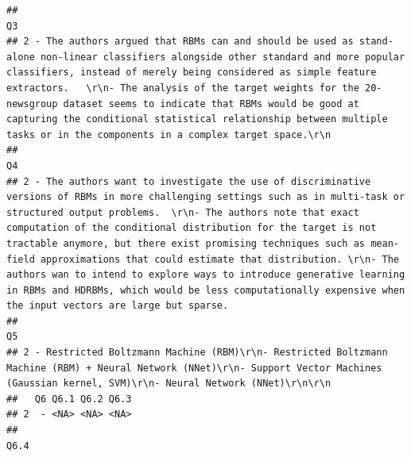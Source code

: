 \documentclass[
]{article}
\begin{document}
\begin{verbatim}
##                                                                                                                                                                                                                                                                                                                                                                                                                                                                       Q3
## 2 - The authors argued that RBMs can and should be used as stand-alone non-linear classifiers alongside other standard and more popular classifiers, instead of merely being considered as simple feature extractors.   \r\n- The analysis of the target weights for the 20-newsgroup dataset seems to indicate that RBMs would be good at capturing the conditional statistical relationship between multiple tasks or in the components in a complex target space.\r\n
##                                                                                                                                                                                                                                                                                                                                                                                                                                                                                                                                                                                                     Q4
## 2 - The authors want to investigate the use of discriminative versions of RBMs in more challenging settings such as in multi-task or structured output problems.  \r\n- The authors note that exact computation of the conditional distribution for the target is not tractable anymore, but there exist promising techniques such as mean-field approximations that could estimate that distribution. \r\n- The authors wan to intend to explore ways to introduce generative learning in RBMs and HDRBMs, which would be less computationally expensive when the input vectors are large but sparse.
##                                                                                                                                                                                            Q5
## 2 - Restricted Boltzmann Machine (RBM)\r\n- Restricted Boltzmann Machine (RBM) + Neural Network (NNet)\r\n- Support Vector Machines (Gaussian kernel, SVM)\r\n- Neural Network (NNet)\r\n\r\n
##   Q6 Q6.1 Q6.2 Q6.3
## 2  - <NA> <NA> <NA>
##                                                                                                                Q6.4

\end{verbatim}
\end{document}
